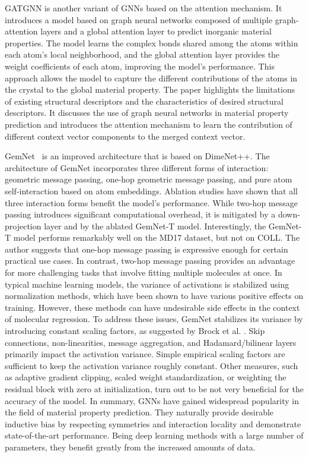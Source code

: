 GATGNN \cite{louis2020graph} is another variant of GNNs based on the attention mechanism. It introduces a model based on graph neural networks composed of multiple graph-attention layers and a global attention layer to predict inorganic material properties. The model learns the complex bonds shared among the atoms within each atom's local neighborhood, and the global attention layer provides the weight coefficients of each atom, improving the model's performance. This approach allows the model to capture the different contributions of the atoms in the crystal to the global material property. The paper highlights the limitations of existing structural descriptors and the characteristics of desired structural descriptors. It discusses the use of graph neural networks in material property prediction and introduces the attention mechanism to learn the contribution of different context vector components to the merged context vector.

GemNet~\cite{gasteiger2021gemnet} is an improved architecture that is based on DimeNet++.
The architecture of GemNet incorporates three different forms of interaction: geometric message passing, one-hop geometric message passing, and pure atom self-interaction based on atom embeddings. Ablation studies have shown that all three interaction forms benefit the model's performance.
While two-hop message passing introduces significant computational overhead, it is mitigated by a down-projection layer and by the ablated GemNet-T model. Interestingly, the GemNet-T model performs remarkably well on the MD17 dataset, but not on COLL. The author suggests that one-hop message passing is expressive enough for certain practical use cases. In contrast, two-hop message passing provides an advantage for more challenging tasks that involve fitting multiple molecules at once.
In typical machine learning models, the variance of activations is stabilized using normalization methods, which have been shown to have various positive effects on training. However, these methods can have undesirable side effects in the context of molecular regression. To address these issues, GemNet stabilizes its variance by introducing constant scaling factors, as suggested by Brock et al. \cite{brockCharacterizingSignalPropagation2021}. Skip connections, non-linearities, message aggregation, and Hadamard/bilinear layers primarily impact the activation variance. Simple empirical scaling factors are sufficient to keep the activation variance roughly constant. Other measures, such as adaptive gradient clipping, scaled weight standardization, or weighting the residual block with zero at initialization, turn out to be not very beneficial for the accuracy of the model.
In summary, GNNs have gained widespread popularity in the field of material property prediction. They naturally provide desirable inductive bias by respecting symmetries and interaction locality and demonstrate state-of-the-art performance. Being deep learning methods with a large number of parameters, they benefit greatly from the increased amounts of data.

